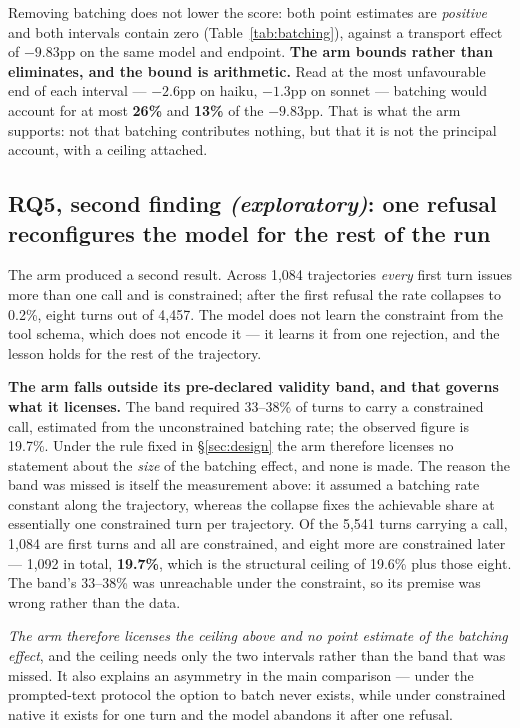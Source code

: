 Removing batching does not lower the score: both point estimates are \emph{positive} and both intervals
contain zero (Table~\ref{tab:batching}), against a transport effect of $-9.83$pp on the same model and
endpoint. \textbf{The arm bounds rather than eliminates, and the bound is arithmetic.} Read at the most
unfavourable end of each interval --- $-2.6$pp on haiku, $-1.3$pp on sonnet --- batching would account for
at most \textbf{26\%} and \textbf{13\%} of the $-9.83$pp. That is what the arm supports: not that
batching contributes nothing, but that it is not the principal account, with a ceiling attached.

\subsection{RQ5, second finding \emph{(exploratory)}: one refusal reconfigures the model
for the rest of the run}
\label{sec:rq5b}

The arm produced a second result. Across 1{,}084 trajectories \emph{every} first turn
issues more than one call and is constrained; after the first refusal the rate collapses to 0.2\%, eight
turns out of 4{,}457. The model does not learn the constraint from the tool schema, which does not encode
it --- it learns it from one rejection, and the lesson holds for the rest of the trajectory.

\textbf{The arm falls outside its pre-declared validity band, and that governs what it licenses.} The band
required 33--38\% of turns to carry a constrained call, estimated from the unconstrained batching rate; the
observed figure is 19.7\%. Under the rule fixed in \S\ref{sec:design} the arm therefore licenses no
statement about the \emph{size} of the batching effect, and none is made. The reason the band was missed is
itself the measurement above: it assumed a batching rate constant along the trajectory, whereas the collapse
fixes the achievable share at essentially one constrained turn per trajectory. Of the 5{,}541 turns carrying
a call, 1{,}084 are first turns and all are constrained, and eight more are constrained later --- 1{,}092 in
total, \textbf{19.7\%}, which is the structural ceiling of 19.6\% plus those eight. The band's 33--38\% was
unreachable under the constraint, so its premise was wrong rather than the data.

\emph{The arm therefore licenses the ceiling above and no point estimate of the batching effect}, and the
ceiling needs only the two intervals rather than the band that was missed. It also explains an asymmetry in
the main comparison --- under the prompted-text protocol the option to batch never exists, while under
constrained native it exists for one turn and the model abandons it after one refusal.

